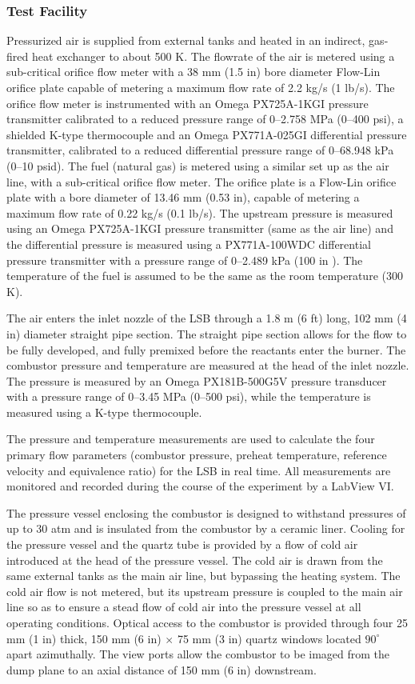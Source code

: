 \subsubsection{Test Facility}

Pressurized air is supplied from external tanks and heated in an indirect, gas-fired heat exchanger to about 500 K.
The flowrate of the air is metered using a sub-critical orifice flow meter with a 38 mm (1.5 in) bore diameter Flow-Lin orifice plate capable of metering a maximum flow rate of 2.2 kg/s (1 lb/s).
The orifice flow meter is instrumented with an Omega PX725A-1KGI pressure transmitter calibrated to a reduced pressure range of 0--2.758 MPa (0--400 psi), a shielded K-type thermocouple and an Omega PX771A-025GI differential pressure transmitter, calibrated to a reduced differential pressure range of 0--68.948 kPa (0--10 psid).
The fuel (natural gas) is metered using a similar set up as the air line, with a sub-critical orifice flow meter.
The orifice plate is a Flow-Lin orifice plate with a bore diameter of 13.46 mm (0.53 in), capable of metering a maximum flow rate of 0.22 kg/s (0.1 lb/s).
The upstream pressure is measured using an Omega PX725A-1KGI pressure transmitter (same as the air line) and the differential pressure is measured using a PX771A-100WDC differential pressure transmitter with a pressure range of 0--2.489 kPa (100 in ).
The temperature of the fuel is assumed to be the same as the room temperature (300 K).

The air enters the inlet nozzle of the LSB through a 1.8 m (6 ft) long, 102 mm (4 in) diameter straight pipe section.
The straight pipe section allows for the flow to be fully developed, and fully premixed before the reactants enter the burner.
The combustor pressure and temperature are measured at the head of the inlet nozzle.
The pressure is measured by an Omega PX181B-500G5V pressure transducer with a pressure range of 0--3.45 MPa (0--500 psi), while the temperature is measured using a K-type thermocouple.

The pressure and temperature measurements are used to calculate the four primary flow parameters (combustor pressure, preheat temperature, reference velocity and equivalence ratio) for the LSB in real time.
All measurements are monitored and recorded during the course of the experiment by a LabView VI.

The pressure vessel enclosing the combustor is designed to withstand pressures of up to 30 atm and is insulated from the combustor by a ceramic liner.
Cooling for the pressure vessel and the quartz tube is provided by a flow of cold air introduced at the head of the pressure vessel.
The cold air is drawn from the same external tanks as the main air line, but bypassing the heating system.
The cold air flow is not metered, but its upstream pressure is coupled to the main air line so as to ensure a stead flow of cold air into the pressure vessel at all operating conditions.
Optical access to the combustor is provided through four 25 mm (1 in) thick, 150 mm (6 in) \(\times\) 75 mm (3 in) quartz windows located \(90^\circ\) apart azimuthally.
The view ports allow the combustor to be imaged from the dump plane to an axial distance of 150 mm (6 in) downstream.


